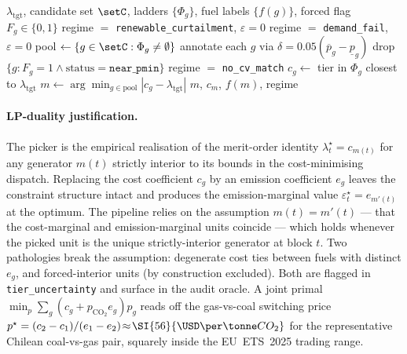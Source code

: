 \begin{algorithm}[t]
\caption{Marginal-unit identification per island}
\label{alg:identify}
\begin{algorithmic}[1]
  \REQUIRE $\lambda_{\mathrm{tgt}}$, candidate set $\setC$, ladders
           $\{\Phi_g\}$, fuel labels $\{f(g)\}$, forced flag
           $F_g\in\{0,1\}$
    \STATE \RETURN regime $=$ \texttt{renewable\_curtailment},
           $\varepsilon=0$
    \STATE \RETURN regime $=$ \texttt{demand\_fail},
           $\varepsilon=0$
  \ENDIF
  \STATE pool $\leftarrow \{g\in\setC : \Phi_g \ne \emptyset\}$
  \STATE annotate each $g$ via $\delta=0.05(\overline{p}_g-\underline{p}_g)$
  \STATE drop $\{g : F_g=1 \land \mathrm{status}=\texttt{near\_pmin}\}$
    \STATE \RETURN regime $=$ \texttt{no\_cv\_match}
  \ENDIF
    \STATE $c_g \leftarrow$ tier in $\Phi_g$ closest to
           $\lambda_{\mathrm{tgt}}$
  \ENDFOR
  \STATE $m \leftarrow \arg\min_{g\in\mathrm{pool}}
           |c_g - \lambda_{\mathrm{tgt}}|$
  \STATE \RETURN $m$, $c_m$, $f(m)$, regime
\end{algorithmic}
\end{algorithm}

\paragraph{LP-duality justification.}
The picker is the empirical realisation of the merit-order
identity $\lambda_t^\star = c_{m(t)}$ for any generator $m(t)$
strictly interior to its bounds in the cost-minimising dispatch.
Replacing the cost coefficient $c_g$ by an emission coefficient
$e_g$ leaves the constraint structure intact and produces the
emission-marginal value $\varepsilon_t^\star = e_{m'(t)}$ at the
optimum.  The pipeline relies on the assumption $m(t)=m'(t)$ — that
the cost-marginal and emission-marginal units coincide — which holds
whenever the picked unit is the unique strictly-interior generator
at block $t$.  Two pathologies break the assumption: degenerate cost
ties between fuels with distinct $e_g$, and forced-interior units
(by construction excluded).  Both are flagged in
\texttt{tier\_uncertainty} and surface in the audit oracle.  A
joint primal $\min_p\sum_g(c_g+p_{\mathrm{CO}_2}e_g)p_g$ reads off
the gas-vs-coal switching price
$p^\star=(c_2-c_1)/(e_1-e_2)\!\approx\!\SI{56}{\USD\per\tonne CO_2}$
for the representative Chilean coal-vs-gas pair, squarely inside the
EU~ETS~2025 trading range.

